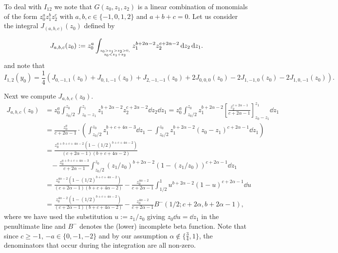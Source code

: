 To deal with $I_{12}$ we note that $G(z_0,z_1,z_2)$ is a linear combination of monomials of the form $z_0^az_1^bz_2^c$ with 
$a,b,c \in \{-1,0,1,2\}$ and $a+b+c=0$. Let us consider the integral $J_{(a,b,c)}(z_0)$ defined by 

\begin{equation}\label{eq:def_Delta_P_computation_int_J_1}
	J_{a,b,c}(z_0) := z_0^a \int_{{z_0>z_1>z_2>0,}\atop{z_0 < z_1+z_2}} z_1^{b+2\alpha-2} z_2^{c+2\alpha-2} \operatorname{\mathrm{d}\hspace{-2pt}} z_2\operatorname{\mathrm{d}\hspace{-2pt}} z_1.
\end{equation}
and note that
\begin{equation}\label{eq:Delta_P_computation_I12_with_J}
	I_{1,2}(y_0) = \frac{1}{4} (J_{0,-1,1}(z_0)+J_{0,1,-1}(z_0)+J_{2,-1,-1}(z_0)+2J_{0,0,0}(z_0)-2J_{1,-1,0}(z_0)-2J_{1,0,-1}(z_0)).
\end{equation}

Next we compute $J_{a,b,c}(z_0)$.
\begin{align*}
	J_{a,b,c}(z_0) 
	&= z_0^a \int_{z_0/2}^{z_0}\int_{z_0-z_1}^{z_1} z_1^{b+2\alpha-2} z_2^{c+2\alpha-2} \dd z_2 \dd z_1
		= z_0^a \int_{z_0/2}^{z_0} z_1^{b+2\alpha-2} \left[ \frac{ z_2^{c+2\alpha-1} }{ c+2\alpha-1 } \right]_{z_0-z_1}^{z_1} \dd z_1\\
	&= \frac{z_0^a}{c+2\alpha-1} \cdot \left( \int_{z_0/2}^{z_0} z_1^{b+c+4\alpha-3} \dd z_1
	   - \int_{z_0/2}^{z_0} z_1^{b+2\alpha-2} (z_0-z_1)^{c+2\alpha-1} \dd z_1 \right) \\
	&= \frac{z_0^{a+b+c+4\alpha-2}(1-(1/2)^{b+c+4\alpha-2})}{(c+2\alpha-1)(b+c+4\alpha-2)} \\
	&\hspace{10pt}- \frac{z_0^{a+b+c+4\alpha-3}}{c+2\alpha-1} \int_{z_0/2}^{z_0}  \left(z_1/z_0\right)^{b+2\alpha-2} 
	    \left(1-(z_1/z_0)\right)^{c+2\alpha-1} \dd z_1\\
	&= \frac{z_0^{4\alpha-2}(1-(1/2)^{b+c+4\alpha-2})}{(c+2\alpha-1)(b+c+4\alpha-2)} 
		- \frac{z_0^{4\alpha-2}}{c+2\alpha-1}
	   \int_{1/2}^1  u^{b+2\alpha-2}(1-u)^{c+2\alpha-1} \dd u \\
	&= \frac{z_0^{4\alpha-2}(1-(1/2)^{b+c+4\alpha-2})}{(c+2\alpha-1)(b+c+4\alpha-2)} 
		- \frac{z_0^{4\alpha-2}}{c+2\alpha-1} B^-(1/2;c+2\alpha, b+2\alpha-1),
\end{align*}
where we have used the substitution $u := z_1/z_0$ giving $z_0 \dd u = \dd z_1$ in the penultimate line and
$B^-$ denotes the (lower) incomplete beta function. Note that since $c \geq -1$, $-a \in \{0,-1,-2\}$ and by our assumption $\alpha \not \in \{\frac{3}{4},1\}$, the denominators that occur during the integration are all non-zero.

